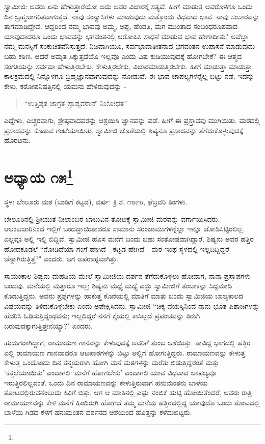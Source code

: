 ಸ್ವಾಮೀಜಿ: ಅವರು ಏನು ಹೇಳುತ್ತಾರೆಯೋ ಅದು ಅವರ ವಿಚಾರಕ್ಕೆ ಸತ್ಯವೆ. ಹೀಗೆ ಮಾಡುತ್ತ ಅವರೊಳಗೂ ಒಂದು ದಿನ ಬ್ರಹ್ಮಜಾಗರಿತವಾಗುತ್ತದೆ. ನಾವು ಸಂನ್ಯಾಸಿಗಳು ಮಾಡುವುದು ಮತ್ತೊಂದು ವಿಧವಾದ ಭಾವ. ನಾವು ಸಂಸಾರವನ್ನು ತಾಗಮಾಡಿದ್ದೇವೆ. ಆದ್ದರಿಂದ ನಮ್ಮ ಭಾವವು ಅಮ್ಮ, ಅಪ್ಪ, ಹೆಂಡತಿ, ಮಗ ಮುಂತಾದ ಸಂಬಂಧರೂಪವಾದ ಯಾವುದಾದರೂ ಒಂದು ಭಾವವನ್ನು ಭಗವಂತನಲ್ಲಿ ಆರೋಪಿಸಿ ಸಾಧನೆ ಮಾಡುವ ಭಾವ ಹೇಗಾದೀತು? ಅವೆಲ್ಲಾ ನಮ್ಮ ಮನಸ್ಸಿಗೆ ಸಂಕುಚಿತವೆನಿಸುತ್ತದೆ. ನಿಜವಾಗಿಯೂ, ಸರ್ವಭಾವಾತೀತನಾದ ಭಗವಂತನ ಉಪಾಸನೆ ಮಾಡುವುದು ಬಹು ಕಠಿಣ. ಆದರೆ ಅಮೃತ ಸಿಕ್ಕುತ್ತದೆಯೊ ಇಲ್ಲವೊ ಎಂದು ವಿಷ ಕುಡಿಯುವುದಕ್ಕೆ ಹೋಗಬೇಕೆ? ಈ ಆತ್ಮದ ಸಂಗತಿಯನ್ನು ಸರ್ವದಾ ಹೇಳುತ್ತಿರಬೇಕು, ಕೇಳುತ್ತಿರಬೇಕು, ವಿಚಾರಮಾಡುತ್ತಿರಬೇಕು. ಹೀಗೆ ಮಾಡುತ್ತಾ ಮಾಡುತ್ತಾ ಕಾಲಕ್ರಮದಲ್ಲಿ ನಿನ್ನೊಳಗೂ ಬ್ರಹ್ಮಜ್ಞಾನವಾಗುವುದನ್ನು ನೋಡುವೆ. ಈ ಭಾವ ಚಾಪಲ್ಯಗಳನ್ನೆಲ್ಲ ಬಿಟ್ಟು ನಡೆ. ಇದನ್ನು ಕೇಳು, ಕಠೋಪನಿಷತ್ತಿನಲ್ಲಿ ಯಮನು ಹೇಳಿರುವುದನ್ನು -

\begin{verse}
“ಉತ್ತಿಷ್ಠತ ಜಾಗ್ರತ ಪ್ರಾಪ್ಯವರಾನ್ ನಿಬೋಧತ”
\end{verse}

ಎದ್ದೇಳು, ಎಚ್ಚರವಾಗು, ಶ್ರೇಷ್ಠವಾದವರನ್ನು ಆಶ್ರಯಿಸಿ ಜ್ಞಾನವನ್ನು ಪಡೆ. ಹೀಗೆ ಈ ಪ್ರಸ್ತಾವವು ಮುಗಿಯಿತು. ಮಠದಲ್ಲಿ ಪ್ರಸಾದವನ್ನು ಕೊಡುವ ಗಂಟೆಯಾಯಿತು. ಸ್ವಾಮೀಜಿ ಜೊತೆಯಲ್ಲಿ ಶಿಷ್ಯನೂ ಪ್ರಸಾದವನ್ನು ತೆಗೆದುಕೊಳ್ಳುವುದಕ್ಕೆ ಹೊರಟನು.

\newpage

\chapter[ಅಧ್ಯಾಯ ೧೫]{ಅಧ್ಯಾಯ ೧೫\protect\footnote{}}

\centerline{ಸ್ಥಳ: ಬೇಲೂರು ಮಠ (ಬಾಡಿಗೆ ಕಟ್ಟಡ), ವರ್ಷ: ಕ್ರಿ.ಶ. ೧೮೯೮, ಫೆಬ್ರವರಿ ತಿಂಗಳು.}

ಬೇಲೂರಿನಲ್ಲಿ ಶ‍್ರೀಯುತ ನೀಲಾಂಬರ ಬಾಬುವಿನ ತೋಟಕ್ಕೆ ಸ್ವಾಮೀಜಿ ಮಠವನ್ನು ವರ್ಗಾಯಿಸಿದರು. ಆಲಂಬಜಾರಿನಿಂದ ಇಲ್ಲಿಗೆ ಬಂದದ್ದಾಯಿತಾದರೂ ಸಾಮಾನು ಸರಂಜಾಮುಗಳನ್ನೆಲ್ಲಾ ಇನ್ನೂ ಜೋಡಿಸಿಟ್ಟಿರಲಿಲ್ಲ. ಎಲ್ಲವೂ ಅಲ್ಲಿ ಇಲ್ಲಿ ಬಿದ್ದಿವೆ. ಸ್ವಾಮೀಜಿ ಹೊಸ ಮನೆಗೆ ಬಂದು ಬಹು ಸಂತೋಷವಾಗಿದ್ದಾರೆ. ಶಿಷ್ಯನು ಅವರ ಹತ್ತಿರ ಹೋದಕೂಡಲೆ “ನೋಡಿದೆಯಾ ಗಂಗೆ ಹೇಗಿದೆ - ಕಟ್ಟಡ ಹೇಗಿದೆ - ಮಠ ಇಂಥ ಸ್ಥಳದಲ್ಲಿ ಇಲ್ಲದಿದ್ದಿದ್ದರೆ ಚೆನ್ನಾಗಿರುತ್ತಿತ್ತೆ?" ಎಂದರು. ಆಗ ಅಪರಾಹ್ನವಾಗಿತ್ತು.

ಸಾಯಂಕಾಲ ಶಿಷ್ಯನು ಮಹಡಿಯ ಮೇಲೆ ಸ್ವಾಮೀಜಿಯ ದರ್ಶನ ತೆಗೆದುಕೊಳ್ಳಲು ಹೋದಾಗ, ನಾನಾ ಪ್ರಸ್ತಾಪಗಳು ಬಂದವು. ಮನೆಯಲ್ಲಿ ಮತ್ತಾರೂ ಇಲ್ಲ; ಶಿಷ್ಯನು ಮಧ್ಯೆ ಮಧ್ಯೆ ಎದ್ದು ಸ್ವಾಮೀಜಿಗೆ ತಂಬಾಕನ್ನು ಸಿದ್ದಮಾಡಿ ಕೊಡುತ್ತಿದ್ದನು. ಅವನು ಪ್ರಶ್ನೆಗಳನ್ನು ಹಾಕುತ್ತ ಕೊನೆಯಲ್ಲಿ ಮಾತಿಗೆ ಮಾತು ಬಂದು ಸ್ವಾಮಿಜಿಯ ಬಾಲ್ಯಕಾಲದ ವಿಷಯವನ್ನು ತಿಳಿದುಕೊಳ್ಳಬೇಕು ಎಂದು ಅಪೇಕ್ಷಿಸಿದನು. ಸ್ವಾಮೀಜಿ “ಚಿಕ್ಕ ವಯಸ್ಸಿನಿಂದ ನಾನು ಭೂತ ಪಿಶಾಚಿಗಳನ್ನು ಹೆದರಿಸಿ ಓಡಿಸುತ್ತಿದ್ದಂಥವನು; ಇಲ್ಲದಿದ್ದರೆ ನನಗೆ ಕೈಯಲ್ಲಿ ಕಾಸಿಲ್ಲದೆ ಪ್ರಪಂಚವನ್ನು ತಿರುಗಿ ಬರುವುದಕ್ಕಾಗುತ್ತಿತ್ತೇನಯ್ಯಾ?" ಎಂದರು.

ಹುಡುಗರಾಗಿದ್ದಾಗ, ರಾಮಾಯಣ ಗಾನವನ್ನು ಕೇಳುವುದಕ್ಕೆ ಅವರಿಗೆ ತುಂಬ ಆಶೆಯಿತ್ತು. ತಾವಿದ್ದ ಭಾಗದಲ್ಲಿ ಹತ್ತಿರ ಎಲ್ಲಿ ರಾಮಾಯಣ ಗಾನವಾದರೂ ಆಟಪಾಠಗಳನ್ನು ಬಿಟ್ಟು ಅಲ್ಲಿಗೆ ಹೋಗುತ್ತಿದ್ದರು. ರಾಮಾಯಣವನ್ನು ಕೇಳುತ್ತ ಕೇಳುತ್ತ ಒಂದೊಂದು ದಿನ ತನ್ಮಯರಾಗಿ ಹೋಗಿ ಮನೆ ಮಠಗಳನ್ನು ಮರೆತು ಬಿಡುತ್ತಿದ್ದರಂತೆ ಮತ್ತು ‘ಕತ್ತಲೆಯಾಯಿತು’ ಎಂದಾಗಲಿ ‘ಮನೆಗೆ ಹೋಗಬೇಕು’ ಎಂದಾಗಲಿ ಯಾವ ವಿಧವಾದ ಚಾಪಲ್ಯವೂ ಇರುತ್ತಿರಲಿಲ್ಲವಂತೆ. ಒಂದು ದಿನ ರಾಮಾಯಣವನ್ನು ಕೇಳುತ್ತಿರುವಾಗ ಹನುಮಂತನು ಬಾಳೆಯ ತೋಟದಲ್ಲಿರುವನೆಂಬುದು ಕಿವಿಗೆ ಬಿತ್ತು. ಆಗ ಆ ಮಾತಿನಲ್ಲಿ ಎಷ್ಟು ನಂಬಿಕೆ ಹುಟ್ಟಿ ಹೋಯಿತೆಂದರೆ, ಅವರು ರಾತ್ರಿ ರಾಮಾಯಣವನ್ನು ಕೇಳಿ ಮನೆಗೆ ಹಿಂದಿರುಗಿ ಹೋಗದೆ ತಮ್ಮ ಮನೆಯ ಹತ್ತಿರದಲ್ಲಿದ್ದ ಯಾವುದೊ ಒಂದು ತೋಟದಲ್ಲಿ ಬಾಳೆಯ ಗಿಡದ ಕೆಳಗೆ ಹನುಮಂತನ ದರ್ಶನದ ಆಶೆಯಿಂದ ಹೊತ್ತನ್ನು ಕಳೆದುಬಿಟ್ಟರು.

